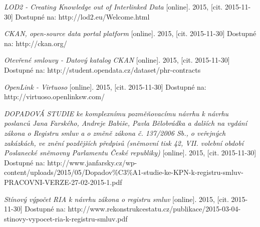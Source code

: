 \begin{thebibliography}{99}
  \emph{LOD2 - Creating Knowledge out of Interlinked Data} 
  [online]. 2015, [cit. 2015-11-30] Dostupné na: 
  http://lod2.eu/Welcome.html
  
  \emph{CKAN, open-source data portal platform} 
  [online]. 2015, [cit. 2015-11-30] Dostupné na: 
  http://ckan.org/
  
  \emph{Otevřené smlouvy - Datový katalog CKAN} 
  [online]. 2015, [cit. 2015-11-30] Dostupné na: 
  http://student.opendata.cz/dataset/phr-contracts   
  
  \emph{OpenLink - Virtuoso} 
  [online]. 2015, [cit. 2015-11-30] Dostupné na: 
  http://virtuoso.openlinksw.com/
 
  \emph{DOPADOVÁ STUDIE
ke komplexnímu pozměňovacímu návrhu k návrhu poslanců Jana Farského, Andreje
Babiše, Pavla Bělobrádka a dalších na vydání zákona o Registru smluv a o změně
zákona č. 137/2006 Sb., o veřejných zakázkách, ve znění pozdějších předpisů (sněmovní tisk 42, VII. volební období Poslanecké sněmovny Parlamentu České republiky)} 
  [online]. 2015, [cit. 2015-11-30] Dostupné na: 
  http://www.janfarsky.cz/wp-content/uploads/2015/05/Dopadov\%C3\%A1-studie-ke-KPN-k-registru-smluv-PRACOVNI-VERZE-27-02-2015-1.pdf
  
  \emph{Stínový výpočet RIA k návrhu zákona o registru smluv} 
  [online]. 2015, [cit. 2015-11-30] Dostupné na: 
  http://www.rekonstrukcestatu.cz/publikace/2015-03-04-stinovy-vypocet-ria-k-registru-smluv.pdf

\end{thebibliography}
